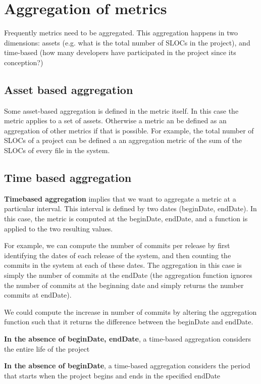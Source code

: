 \documentclass[11pt]{article}
\begin{document}
\section{Aggregation of metrics}

Frequently metrics need to be aggregated. This aggregation happens in two dimensions: assets (e.g. what is the total
number of SLOCs in the project), and time-based (how many developers have participated in the project since its
conception?)

\subsection{Asset based aggregation}


Some asset-based aggregation is defined in the metric itself. In this case the metric applies to a set of assets.
Otherwise a metric an be defined as an aggregation of other metrics if that is possible. For example, the total number
of SLOCs of a project can be defined a an aggregation metric of the sum of the SLOCs of every file in the system.

\subsection{Time based aggregation}

\textbf{Timebased aggregation} implies that we want to aggregate a metric at a particular interval. This interval is defined by
two dates (beginDate, endDate).
In this case, the metric is computed at the beginDate, endDate, and a function is applied to the two resulting values.

For example, we can compute the number of commits per release by first identifying the dates of each release of the
system, and then counting the commits in the system at each of these dates. The aggregation in this case is simply the
number of commits at the endDate (the aggregation function ignores the number of commits at the beginning date and simply
returns the number commits at endDate).

We could compute the increase in number of commits by altering the aggregation function such that it returns the
difference between the beginDate and endDate.

\textbf{In the absence of beginDate, endDate}, a time-based aggregation considers the entire life of the project

\textbf{In the absence of beginDate}, a time-based aggregation considers the period that starts  when the project begins
  and ends in the specified endDate
\end{document}
